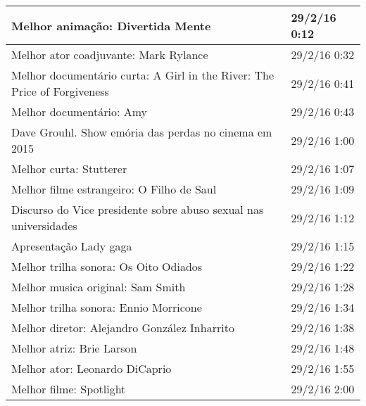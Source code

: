 \begin{table}[H]
\begin{tabular}{|l|l|}
		Melhor anima\c{c}\~{a}o: Divertida Mente                                                   & 29/2/16 0:12              \\ \hline
		Melhor ator coadjuvante: Mark Rylance                                              & 29/2/16 0:32              \\ \hline
		Melhor document\'{a}rio curta: A Girl in the River: The Price of Forgiveness           & 29/2/16 0:41              \\ \hline
		Melhor document\'{a}rio: Amy                                                           & 29/2/16 0:43              \\ \hline
		Dave Grouhl. Show em\'{o}ria das perdas no cinema em 2015 & 29/2/16 1:00              \\ \hline
		Melhor curta: Stutterer                                                            & 29/2/16 1:07              \\ \hline
		Melhor filme estrangeiro: O Filho de Saul                                          & 29/2/16 1:09              \\ \hline
		Discurso do Vice presidente sobre abuso sexual nas universidades                   & 29/2/16 1:12              \\ \hline
		Apresenta\c{c}\~{a}o Lady gaga                                                             & 29/2/16 1:15              \\ \hline
		Melhor trilha sonora: Os Oito Odiados                                              & 29/2/16 1:22              \\ \hline
		Melhor musica original: Sam Smith                                                  & 29/2/16 1:28              \\ \hline
		Melhor trilha sonora: Ennio Morricone                                              & 29/2/16 1:34              \\ \hline
		Melhor diretor: Alejandro Gonz\'{a}lez Inharrito                                       & 29/2/16 1:38              \\ \hline
		Melhor atriz: Brie Larson                                                          & 29/2/16 1:48              \\ \hline
		Melhor ator: Leonardo DiCaprio                                                     & 29/2/16 1:55              \\ \hline
		Melhor filme: Spotlight                                                            & 29/2/16 2:00              \\ \hline
	\end{tabular}
\end{table}
